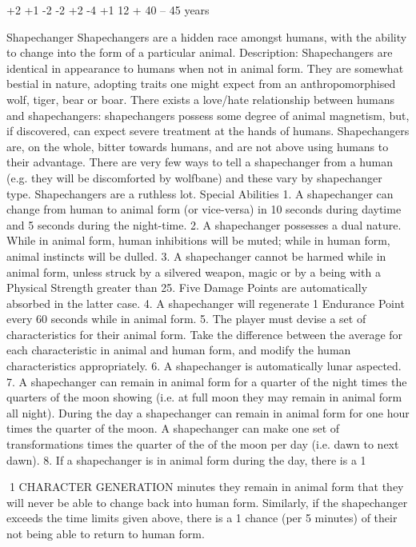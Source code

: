 \documentclass[a4paper]{article}
\begin{document}
\begin{multicols}{3}
+2
+1
-2
-2
+2
-4
+1
12 +
40 – 45 years

Shapechanger
Shapechangers are a hidden race amongst humans, with the ability to change into the form of
a particular animal.
Description: Shapechangers are identical in appearance to humans when not in animal form. They
are somewhat bestial in nature, adopting traits one
might expect from an anthropomorphised wolf,
tiger, bear or boar. There exists a love/hate relationship between humans and shapechangers:
shapechangers possess some degree of animal
magnetism, but, if discovered, can expect severe
treatment at the hands of humans. Shapechangers
are, on the whole, bitter towards humans, and are
not above using humans to their advantage. There
are very few ways to tell a shapechanger from a
human (e.g. they will be discomforted by wolfbane) and these vary by shapechanger type.
Shapechangers are a ruthless lot.
Special Abilities
1. A shapechanger can change from human to
animal form (or vice-versa) in 10 seconds during
daytime and 5 seconds during the night-time.
2. A shapechanger possesses a dual nature. While
in animal form, human inhibitions will be muted;
while in human form, animal instincts will be
dulled.
3. A shapechanger cannot be harmed while in
animal form, unless struck by a silvered weapon,
magic or by a being with a Physical Strength
greater than 25. Five Damage Points are automatically absorbed in the latter case.
4. A shapechanger will regenerate 1 Endurance
Point every 60 seconds while in animal form.
5. The player must devise a set of characteristics
for their animal form. Take the difference between
the average for each characteristic in animal and
human form, and modify the human characteristics
appropriately.
6. A shapechanger is automatically lunar aspected.
7. A shapechanger can remain in animal form for a
quarter of the night times the quarters of the moon
showing (i.e. at full moon they may remain in
animal form all night). During the day a
shapechanger can remain in animal form for one
hour times the quarter of the moon. A
shapechanger can make one set of transformations
times the quarter of the of the moon per day (i.e.
dawn to next dawn).
8. If a shapechanger is in animal form during the
day, there is a 1%

1 CHARACTER GENERATION
minutes they remain in animal form that they will
never be able to change back into human form.
Similarly, if the shapechanger exceeds the time
limits given above, there is a 1%
chance (per 5 minutes) of their not being able to
return to human form.


\end{multicols}
\end{document}
